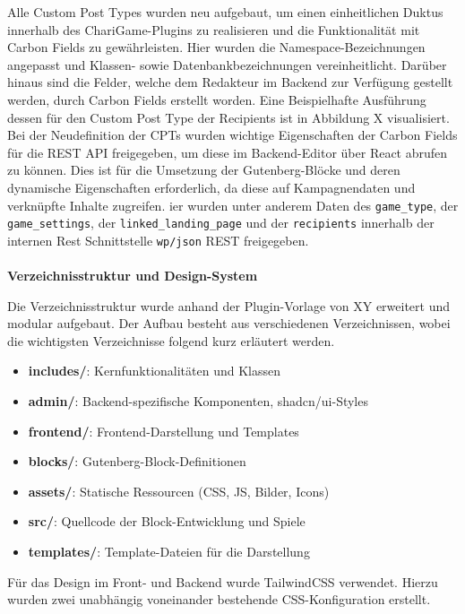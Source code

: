 Alle Custom Post Types wurden neu aufgebaut, um einen einheitlichen Duktus innerhalb des ChariGame-Plugins zu realisieren und die Funktionalität mit Carbon Fields zu gewährleisten.
Hier wurden die Namespace-Bezeichnungen angepasst und Klassen- sowie Datenbankbezeichnungen vereinheitlicht.
Darüber hinaus sind die Felder, welche dem Redakteur im Backend zur Verfügung gestellt werden, durch Carbon Fields erstellt worden.
Eine Beispielhafte Ausführung dessen für den Custom Post Type der Recipients ist in Abbildung X visualisiert. %
Bei der Neudefinition der CPTs wurden wichtige Eigenschaften der Carbon Fields für die REST API freigegeben, um diese im Backend-Editor über React abrufen zu können.
Dies ist für die Umsetzung der Gutenberg-Blöcke und deren dynamische Eigenschaften erforderlich, da diese auf Kampagnendaten und verknüpfte Inhalte zugreifen.
ier wurden unter anderem Daten des \texttt{game\_type}, der \texttt{game\_settings}, der \texttt{linked\_landing\_page} und der \texttt{recipients} innerhalb der internen Rest Schnittstelle \texttt{wp/json} REST freigegeben. %
\\\\
\textbf{Verzeichnisstruktur und Design-System}

Die Verzeichnisstruktur wurde anhand der Plugin-Vorlage von XY erweitert und modular aufgebaut.
Der Aufbau besteht aus verschiedenen Verzeichnissen, wobei die wichtigsten Verzeichnisse folgend kurz erläutert werden.

\begin{itemize}
    \item \textbf{includes/}: Kernfunktionalitäten und Klassen
    \item \textbf{admin/}: Backend-spezifische Komponenten, shadcn/ui-Styles
    \item \textbf{frontend/}: Frontend-Darstellung und Templates
    \item \textbf{blocks/}: Gutenberg-Block-Definitionen
    \item \textbf{assets/}: Statische Ressourcen (CSS, JS, Bilder, Icons)
    \item \textbf{src/}: Quellcode der Block-Entwicklung und Spiele
    \item \textbf{templates/}: Template-Dateien für die Darstellung
\end{itemize}

Für das Design im Front- und Backend wurde TailwindCSS verwendet.
Hierzu wurden zwei unabhängig voneinander bestehende CSS-Konfiguration erstellt.

